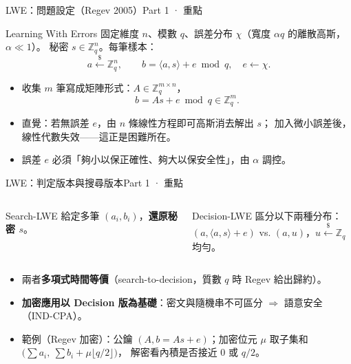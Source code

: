 \documentclass[aspectratio=169, 11pt]{beamer}
\newcommand{\Z}{\mathbb{Z}}
\begin{document}
\begin{frame}{LWE：問題設定（Regev 2005）}{Part 1 · 重點}
  \begin{block}{Learning With Errors}
    固定維度 $n$、模數 $q$、誤差分布 $\chi$（寬度 $\alpha q$ 的離散高斯，$\alpha\ll1$）。
    秘密 $s\in\Z_q^n$。每筆樣本：
    \[
      a \xleftarrow{\$} \Z_q^n,\qquad
      b = \langle a, s\rangle + e \bmod q,\quad e\leftarrow\chi.
    \]
  \end{block}
  \begin{itemize}\small
    \item 收集 $m$ 筆寫成矩陣形式：$A\in\Z_q^{m\times n}$，
      \[
        b = A s + e \bmod q \in \Z_q^m.
      \]
    \item 直覺：若無誤差 $e$，由 $n$ 條線性方程即可高斯消去解出 $s$；
      \alert{加入微小誤差後，線性代數失效}——這正是困難所在。
    \item 誤差 $e$ 必須「夠小以保正確性、夠大以保安全性」，由 $\alpha$ 調控。
  \end{itemize}
\end{frame}

\begin{frame}{LWE：判定版本與搜尋版本}{Part 1 · 重點}
  \begin{columns}[T]
    \begin{column}{0.5\textwidth}
      \begin{block}{Search-LWE}
        給定多筆 $(a_i,b_i)$，\textbf{還原秘密 $s$}。
      \end{block}
    \end{column}
    \begin{column}{0.5\textwidth}
      \begin{block}{Decision-LWE}
        區分以下兩種分布：\\
        $(a, \langle a,s\rangle+e)$ \quad vs.\quad
        $(a, u)$，$u\xleftarrow{\$}\Z_q$ 均勻。
      \end{block}
    \end{column}
  \end{columns}
  \vspace{4pt}
  \begin{itemize}\small
    \item 兩者\textbf{多項式時間等價}（search-to-decision，質數 $q$ 時 Regev 給出歸約）。
    \item \textbf{加密應用以 Decision 版為基礎}：密文與隨機串不可區分 $\Rightarrow$ 語意安全（IND-CPA）。
    \item 範例（Regev 加密）：公鑰 $(A, b=As+e)$；加密位元 $\mu$ 取子集和
      $\bigl(\textstyle\sum a_i,\ \sum b_i + \mu\lfloor q/2\rfloor\bigr)$，
      解密看內積是否接近 $0$ 或 $q/2$。
  \end{itemize}
\end{frame}
\end{document}
